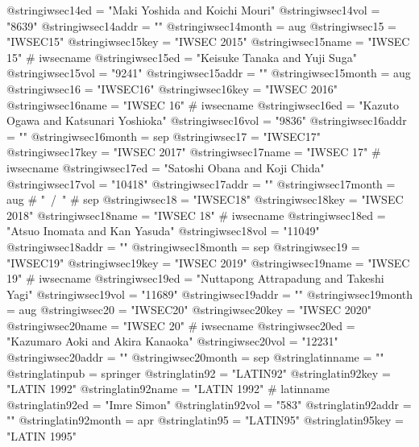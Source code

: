 @string{iwsec14ed =             "Maki Yoshida and Koichi Mouri"}
@string{iwsec14vol =            "8639"}
@string{iwsec14addr =           ""}
@string{iwsec14month =          aug}
@string{iwsec15 =               "IWSEC15"}
@string{iwsec15key =            "IWSEC 2015"}
@string{iwsec15name =           "IWSEC 15" # iwsecname}
@string{iwsec15ed =             "Keisuke Tanaka and Yuji Suga"}
@string{iwsec15vol =            "9241"}
@string{iwsec15addr =           ""}
@string{iwsec15month =          aug}
@string{iwsec16 =               "IWSEC16"}
@string{iwsec16key =            "IWSEC 2016"}
@string{iwsec16name =           "IWSEC 16" # iwsecname}
@string{iwsec16ed =             "Kazuto Ogawa and Katsunari Yoshioka"}
@string{iwsec16vol =            "9836"}
@string{iwsec16addr =           ""}
@string{iwsec16month =          sep}
@string{iwsec17 =               "IWSEC17"}
@string{iwsec17key =            "IWSEC 2017"}
@string{iwsec17name =           "IWSEC 17" # iwsecname}
@string{iwsec17ed =             "Satoshi Obana and Koji Chida"}
@string{iwsec17vol =            "10418"}
@string{iwsec17addr =           ""}
@string{iwsec17month =          aug # "~/~" # sep}
@string{iwsec18 =               "IWSEC18"}
@string{iwsec18key =            "IWSEC 2018"}
@string{iwsec18name =           "IWSEC 18" # iwsecname}
@string{iwsec18ed =             "Atsuo Inomata and Kan Yasuda"}
@string{iwsec18vol =            "11049"}
@string{iwsec18addr =           ""}
@string{iwsec18month =          sep}
@string{iwsec19 =               "IWSEC19"}
@string{iwsec19key =            "IWSEC 2019"}
@string{iwsec19name =           "IWSEC 19" # iwsecname}
@string{iwsec19ed =             "Nuttapong Attrapadung and Takeshi Yagi"}
@string{iwsec19vol =            "11689"}
@string{iwsec19addr =           ""}
@string{iwsec19month =          aug}
@string{iwsec20 =               "IWSEC20"}
@string{iwsec20key =            "IWSEC 2020"}
@string{iwsec20name =           "IWSEC 20" # iwsecname}
@string{iwsec20ed =             "Kazumaro Aoki and Akira Kanaoka"}
@string{iwsec20vol =            "12231"}
@string{iwsec20addr =           ""}
@string{iwsec20month =          sep}
@string{latinname =             ""}
@string{latinpub =              springer}
@string{latin92 =               "LATIN92"}
@string{latin92key =            "LATIN 1992"}
@string{latin92name =           "LATIN 1992" # latinname}
@string{latin92ed =             "Imre Simon"}
@string{latin92vol =            "583"}
@string{latin92addr =           ""}
@string{latin92month =          apr}
@string{latin95 =               "LATIN95"}
@string{latin95key =            "LATIN 1995"}
